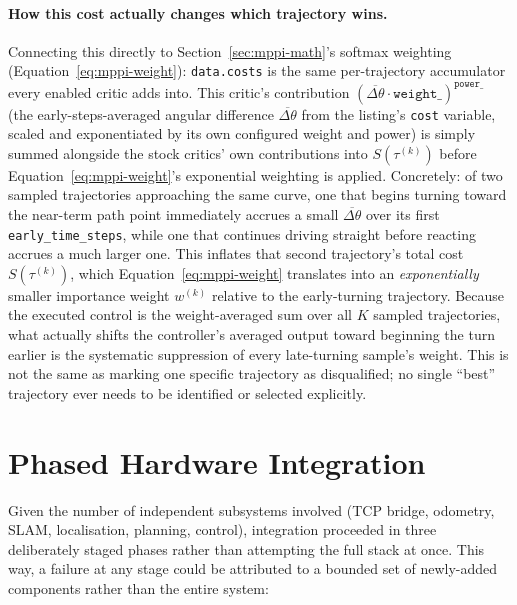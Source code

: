 \paragraph{How this cost actually changes which trajectory wins.}
Connecting this directly to Section~\ref{sec:mppi-math}'s softmax
weighting (Equation~\ref{eq:mppi-weight}): \texttt{data.costs} is the
same per-trajectory accumulator every enabled critic adds into. This
critic's contribution
$\left(\overline{\Delta\theta} \cdot \texttt{weight\_}\right)^{\texttt{power\_}}$
(the early-steps-averaged angular difference $\overline{\Delta\theta}$
from the listing's \texttt{cost} variable, scaled and exponentiated by
its own configured weight and power) is simply summed alongside the
stock critics' own contributions into $S(\tau^{(k)})$ before
Equation~\ref{eq:mppi-weight}'s exponential weighting is applied.
Concretely: of two sampled trajectories approaching the same curve,
one that begins turning toward the near-term path point immediately
accrues a small $\overline{\Delta\theta}$ over its first
\texttt{early\_time\_steps}, while one that continues driving
straight before reacting accrues a much larger one. This inflates
that second trajectory's total cost $S(\tau^{(k)})$, which
Equation~\ref{eq:mppi-weight} translates into an \emph{exponentially}
smaller importance weight $w^{(k)}$ relative to the early-turning
trajectory. Because the
executed control is the weight-averaged sum over all $K$ sampled
trajectories, what actually shifts the controller's averaged output
toward beginning the turn earlier is the systematic suppression of
every late-turning sample's weight. This is not the same as marking
one specific trajectory as disqualified; no single ``best'' trajectory
ever needs to be identified or selected explicitly.

\section{Phased Hardware Integration}
\label{sec:phased-integration}

Given the number of independent subsystems involved (TCP bridge,
odometry, SLAM, localisation, planning, control), integration
proceeded in three deliberately staged phases rather than attempting
the full stack at once. This way, a failure at any stage could be
attributed to a bounded set of newly-added components rather than the
entire system:

